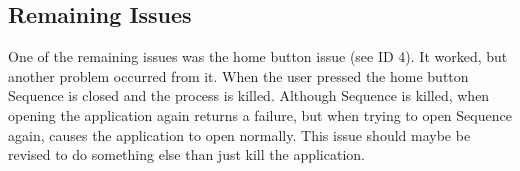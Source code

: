 \subsection{Remaining Issues}
One of the remaining issues was the home button issue (see ID 4). It worked, but another problem occurred from it. 
When the user pressed the home button Sequence is closed and the process is killed. Although Sequence is killed, when opening the application again returns a failure, but when trying to open Sequence again, causes the application to open normally.
This issue should maybe be revised to do something else than just kill the application.

